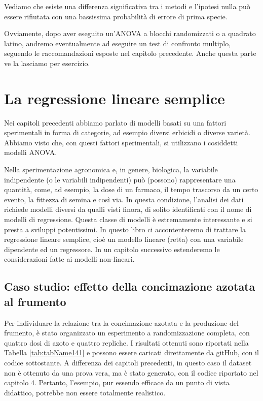 \documentclass[a4paper,12pt,oneside]{book}
\begin{document}
Vediamo che esiste una differenza significativa tra i metodi e l'ipotesi nulla può essere rifiutata con una bassissima probabilità di errore di prima specie.

Ovviamente, dopo aver eseguito un'ANOVA a blocchi randomizzati o a quadrato latino, andremo eventualmente ad eseguire un test di confronto multiplo, seguendo le raccomandazioni esposte nel capitolo precedente. Anche questa parte ve la lasciamo per esercizio.

\hypertarget{la-regressione-lineare-semplice}{%
\chapter{La regressione lineare semplice}\label{la-regressione-lineare-semplice}}

Nei capitoli precedenti abbiamo parlato di modelli basati su una fattori sperimentali in forma di categorie, ad esempio diversi erbicidi o diverse varietà. Abbiamo visto che, con questi fattori sperimentali, si utilizzano i cosiddetti modelli ANOVA.

Nella sperimentazione agronomica e, in genere, biologica, la variabile indipendente (o le variabili indipendenti) può (possono) rappresentare una quantità, come, ad esempio, la dose di un farmaco, il tempo trascorso da un certo evento, la fittezza di semina e così via. In questa condizione, l'analisi dei dati richiede modelli diversi da qualli visti finora, di solito identificati con il nome di modelli di regressione. Questa classe di modelli è estremamente interessante e si presta a sviluppi potentissimi. In questo libro ci accontenteremo di trattare la regressione lineare semplice, cioè un modello lineare (retta) con una variabile dipendente ed un regressore. In un capitolo successivo estenderemo le considerazioni fatte ai modelli non-lineari.

\hypertarget{caso-studio-effetto-della-concimazione-azotata-al-frumento}{%
\section{Caso studio: effetto della concimazione azotata al frumento}\label{caso-studio-effetto-della-concimazione-azotata-al-frumento}}

Per individuare la relazione tra la concimazione azotata e la produzione del frumento, è stato organizzato un esperimento a randomizzazione completa, con quattro dosi di azoto e quattro repliche. I risultati ottenuti sono riportati nella Tabella \ref{tab:tabName141} e possono essere caricati direttamente da gitHub, con il codice sottostante. A differenza dei capitoli precedenti, in questo caso il dataset non è ottenuto da una prova vera, ma è stato generato, con il codice riportato nel capitolo 4. Pertanto, l'esempio, pur essendo efficace da un punto di vista didattico, potrebbe non essere totalmente realistico.
\end{document}
